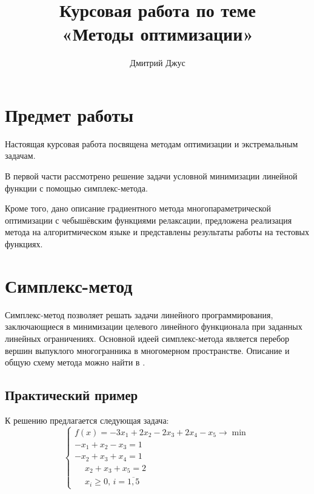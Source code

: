 \documentclass{article}
\renewcommand{\geq}{\geqslant}
\theoremstyle{remark}
\theoremstyle{definition}
\numberwithin{equation}{section}
\begin{document}
\author{Дмитрий Джус}
\title{Курсовая работа по теме \\
  \Huge{«Методы оптимизации»}}
\pretitle{\begin{center}\LARGE}
\posttitle{\par\end{center}\vskip 3pc}
\date{}
\maketitle
\thispagestyle{empty}

\clearpage
\tableofcontents

\clearpage
\listoffigures

\clearpage
\section{Предмет работы}

Настоящая курсовая работа посвящена методам оптимизации и
экстремальным задачам.

В первой части рассмотрено решение задачи условной минимизации
линейной функции с помощью симплекс-метода.

Кроме того, дано описание градиентного метода многопараметрической
оптимизации с чебышёвским функциями релаксации, предложена реализация
метода на алгоритмическом языке и представлены результаты работы на
тестовых функциях.

\clearpage
\section{Симплекс-метод}
\label{sec:simplex}

Симплекс-метод позволяет решать задачи линейного программирования,
заключающиеся в минимизации целевого линейного функционала при
заданных линейных ограничениях. Основной идеей симплекс-метода
является перебор вершин выпуклого многогранника в многомерном
пространстве. Описание и общую схему метода можно найти в
\cite{taha05}.

\subsection{Практический пример}

К решению предлагается следующая задача:
\begin{equation}
  \label{eq:lp-initial}
  \begin{cases}
    f(x) = -3x_1+2x_2-2x_3+2x_4-x_5 \to \min \\
    -x_1+x_2-x_3=1 \\
    -x_2+x_3+x_4=1 \\
    \phantom{-}x_2+x_3+x_5=2 \\
    \phantom{-}x_i \geq 0,\, i = \overline{1, 5}
  \end{cases}
\end{equation}
\end{document}
